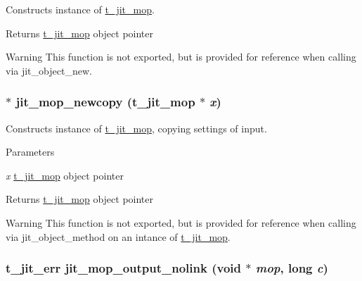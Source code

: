 Constructs instance of \hyperlink{structt__jit__mop}{t\_\-jit\_\-mop}. \begin{DoxyReturn}{Returns}
\hyperlink{structt__jit__mop}{t\_\-jit\_\-mop} object pointer
\end{DoxyReturn}
\begin{DoxyWarning}{Warning}
This function is not exported, but is provided for reference when calling via jit\_\-object\_\-new. 
\end{DoxyWarning}
\hypertarget{group__mopmod_ga85a06757365f8f0d153a543d7f2734c8}{
\subsubsection[{jit\_\-mop\_\-newcopy}]{ $\ast$ jit\_\-mop\_\-newcopy ({\bf t\_\-jit\_\-mop} $\ast$ {\em x})}}
\label{group__mopmod_ga85a06757365f8f0d153a543d7f2734c8}


Constructs instance of \hyperlink{structt__jit__mop}{t\_\-jit\_\-mop}, copying settings of input. 
\begin{DoxyParams}{Parameters}
\item[{\em x}]\hyperlink{structt__jit__mop}{t\_\-jit\_\-mop} object pointer \end{DoxyParams}
\begin{DoxyReturn}{Returns}
\hyperlink{structt__jit__mop}{t\_\-jit\_\-mop} object pointer
\end{DoxyReturn}
\begin{DoxyWarning}{Warning}
This function is not exported, but is provided for reference when calling via jit\_\-object\_\-method on an intance of \hyperlink{structt__jit__mop}{t\_\-jit\_\-mop}. 
\end{DoxyWarning}
\hypertarget{group__mopmod_ga6878129233c6c88c43b8512db44a43ff}{
\subsubsection[{jit\_\-mop\_\-output\_\-nolink}]{\setlength{\rightskip}{0pt plus 5cm}t\_\-jit\_\-err jit\_\-mop\_\-output\_\-nolink (void $\ast$ {\em mop}, \/  long {\em c})}}
\label{group__mopmod_ga6878129233c6c88c43b8512db44a43ff}


